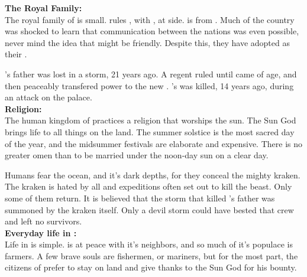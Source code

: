 \documentclass[blue]{NeptuneBall}
\begin{document}
\name{\bHumanShort{}}
%
%
{\bf The Royal Family:}\\
The royal family of \pAmerica{} is small. \cEric{\King} \cEric{} rules \pAmerica{}, with \cEric{\their} \cAriel{\spouse}, \cAriel{\King} \cAriel{} at \cEric{\their} side. \cAriel{} is from \pAtlantis{}. Much of the country was shocked to learn that communication between the nations was even possible, never mind the idea that \pAtlantis{} might be friendly. Despite this, they have adopted \cAriel{} as their \cAriel{\King}.

\cEric{}'s father was lost in a storm, 21 years ago. A regent ruled until \cEric{} came of age, and then peaceably transfered power to the new \cEric{\King}. \cEric{}'s \cSlave{\sibling} was killed, 14 years ago, during an attack on the palace.\\

{\bf Religion:}\\
The human kingdom of \pAmerica{} practices a religion that worships the sun. The Sun God brings life to all things on the land. The summer solstice is the most sacred day of the year, and the midsummer festivals are elaborate and expensive. There is no greater omen than to be married under the noon-day sun on a clear day.

Humans fear the ocean, and it's dark depths, for they conceal the mighty kraken. The kraken is hated by all and expeditions often set out to kill the beast. Only some of them return. It is believed that the storm that killed \cEric{}'s father was summoned by the kraken itself. Only a devil storm could have bested that crew and left no survivors.\\

{\bf Everyday life in \pAmerica{}:}\\
Life in \pAmerica{} is simple. \pAmerica{} is at peace with it's neighbors, and so much of it's populace is farmers. A few brave souls are fishermen, or mariners,  but for the most part, the citizens of \pAmerica{} prefer to stay on land and give thanks to the Sun God for his bounty.
\end{document}
